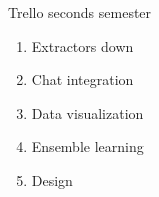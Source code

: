 \begin{frame}{Trello seconds semester}
	\begin{enumerate}
		\item Extractors down
		\item Chat integration
		\item Data visualization
		\item Ensemble learning
		\item Design
	\end{enumerate}
\end{frame}